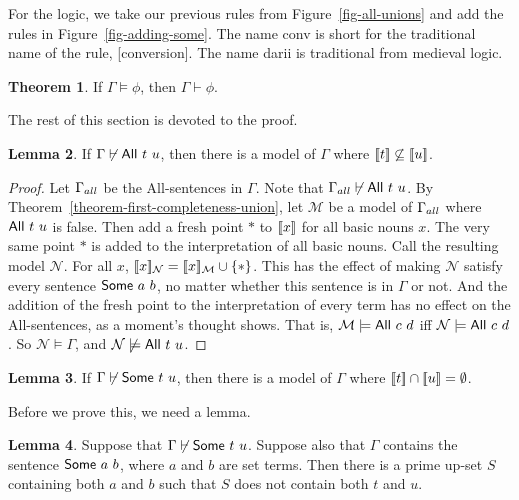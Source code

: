 \documentclass[12pt]{article}
\theoremstyle{definition}
\newtheorem{theorem}{Theorem}
\newtheorem{lemma}[theorem]{Lemma}
\newcommand{\semantics}[1]{[\![\mbox{\em $ #1 $\/}]\!]}
\newcommand{\Model}{\mathcal{M}}
\newcommand{\Nodel}{\mathcal{N}}
\newcommand{\set}[1]{\{ #1 \}}
\newcommand{\proves}{\vdash}
\begin{document}
 For the logic, we take our previous rules from Figure~\ref{fig-all-unions} and add the
 rules in Figure~\ref{fig-adding-some}.
 The name {\sf conv} is short for the traditional name of the rule,
 [\mbox{\sc conversion}].  The name {\sf darii} is traditional from medieval logic.

 
 
 \begin{theorem}
 \label{theorem-completeness-all-some-unions}
 If $\Gamma\models\phi$, then $\Gamma\proves\phi$.
  \end{theorem}
 
 The rest of this section is devoted to the proof.
 
  \begin{lemma}\label{lemma-1-all-some-unions}
 If $\Gamma\not\proves \mbox{\sf All $t$ $u$}$, then there is a model of $\Gamma$
 where $\semantics{t}\not\subseteq\semantics{u}$.
\end{lemma}

\begin{proof}
Let $\Gamma_{\scriptsize all}$ be the {\sf All}-sentences in $\Gamma$.
Note that $\Gamma_{\scriptsize all}\not\proves \mbox{\sf All $t$ $u$}$.
By Theorem~\ref{theorem-first-completeness-union}, let $\Model$
be a model of $\Gamma_{\scriptsize all}$ where $\mbox{\sf All $t$ $u$}$ is false.
Then add a fresh point $*$ to $\semantics{x}$ for all basic nouns $x$.
The very same point  $*$  is added to the interpretation of all basic nouns.
Call the resulting model $\Nodel$.
For all $x$, $\semantics{x}_{\Nodel} = \semantics{x}_{\Model}\cup\set{*}$.
This has the effect of making $\Nodel$ satisfy every sentence $\mbox{\sf Some $a$ $b$}$,
no matter whether this sentence is in $\Gamma$ or not.
And the addition of the fresh point to the interpretation of every term
has no effect on the {\sf All}-sentences, as a moment's thought shows.
That is, $\Model\models\mbox{\sf All $c$ $d$}$ iff  $\Nodel\models\mbox{\sf All $c$ $d$}$.
So $\Nodel\models\Gamma$, and $\Nodel\not\models\mbox{\sf All $t$ $u$}$.
\end{proof}

 \begin{lemma} \label{lemma-2-all-some-unions}
 If $\Gamma\not\proves \mbox{\sf Some $t$ $u$}$, then there is a model of $\Gamma$
 where $\semantics{t}\cap\semantics{u} = \emptyset$.
\end{lemma}

 
Before we prove this, we need a lemma.
 
 \begin{lemma}
 Suppose that $\Gamma\not\proves \mbox{\sf Some $t$ $u$}$.
 Suppose also that $\Gamma$ contains the sentence $\mbox{\sf Some $a$ $b$}$, where $a$ and $b$
 are set terms.
 Then there is a prime up-set $S$ containing both $a$ and $b$ such that
 $S$
 does not contain both $t$ and $u$.
 \end{lemma}
 
\end{document}
